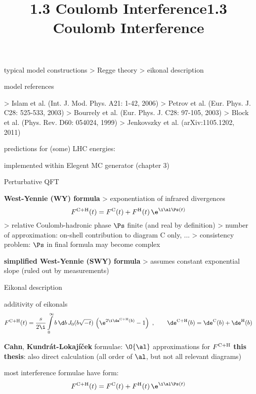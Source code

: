 \> typical model constructions
\>> Regge theory
\>> eikonal description

\> model references

\>> Islam et al. (Int. J. Mod. Phys. A21: 1-42, 2006)
\>> Petrov et al. (Eur. Phys. J. C28: 525-533, 2003)
\>> Bourrely et al. (Eur. Phys. J. C28: 97-105, 2003)
\>> Block et al. (Phys. Rev. D60: 054024, 1999)
\>> Jenkovszky et al. (arXiv:1105.1202, 2011)

\> predictions for (some) LHC energies:

\centerline{}

\> implemented within Elegent MC generator (chapter 3)


\newpage%
\title{1.3 Coulomb Interference}



\centerline{\cmyk{\TitColor}Perturbative QFT\cmyk{\FgColor}}

\centerline{}

\> {\bf West-Yennie (WY) formula}
\>> exponentiation of infrared divergences
$$F^{\rm C+H}(t) = F^{\rm C}(t) + F^{\rm H}(t) \, \e^{\i \al \Ps(t)}$$
\>> relative Coulomb-hadronic phase $\Ps$ finite (and real by definition)
\>> number of approximation: on-shell contribution to diagram C only, ...
\>> consistency problem: $\Ps$ in final formula may become complex

\> {\bf simplified West-Yennie (SWY) formula}
\>> assumes constant exponential slope (ruled out by measurements)

\vfil
\centerline{\cmyk{\TitColor}Eikonal description\cmyk{\FgColor}}

\> additivity of eikonals
$$
	F^{\rm C+H}(t) = {s\over 2\i}\int\limits_0^\infty b\,\d b\,J_0(b\sqrt{-t})\,\left( \e^{2\i\de^{\rm C+H}(b)} - 1 \right)
	\ ,\qquad
	\de^{\rm C+H}(b) = \de^{\rm C}(b) + \de^{\rm H}(b)
$$

\> {\bf Cahn}, {\bf Kundrát-Lokajíček} formulae: $\O{\al}$ approximations for $F^{\rm C+H}$
\> {\bf this thesis}: also direct calculation (all order of $\al$, but not all relevant diagrams)

\newpage%
\title{1.3 Coulomb Interference}

\> most interference formulae have form:
$$F^{\rm C+H}(t) = F^{\rm C}(t) + F^{\rm H}(t) \, \e^{\i \al \Ps(t)}$$

